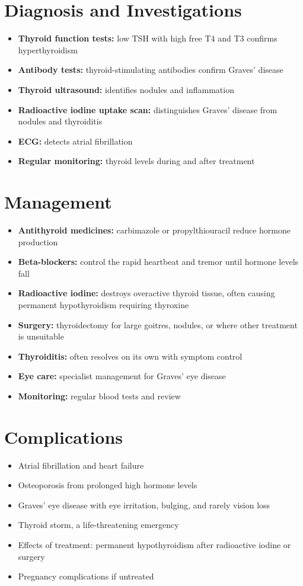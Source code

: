 \section*{Diagnosis and Investigations}
\begin{itemize}
    \item \textbf{Thyroid function tests:} low TSH with high free T4 and T3 confirms hyperthyroidism
    \item \textbf{Antibody tests:} thyroid-stimulating antibodies confirm Graves' disease
    \item \textbf{Thyroid ultrasound:} identifies nodules and inflammation
    \item \textbf{Radioactive iodine uptake scan:} distinguishes Graves' disease from nodules and thyroiditis
    \item \textbf{ECG:} detects atrial fibrillation
    \item \textbf{Regular monitoring:} thyroid levels during and after treatment
\end{itemize}

\section*{Management}
\begin{itemize}
    \item \textbf{Antithyroid medicines:} carbimazole or propylthiouracil reduce hormone production
    \item \textbf{Beta-blockers:} control the rapid heartbeat and tremor until hormone levels fall
    \item \textbf{Radioactive iodine:} destroys overactive thyroid tissue, often causing permanent hypothyroidism requiring thyroxine
    \item \textbf{Surgery:} thyroidectomy for large goitres, nodules, or where other treatment is unsuitable
    \item \textbf{Thyroiditis:} often resolves on its own with symptom control
    \item \textbf{Eye care:} specialist management for Graves' eye disease
    \item \textbf{Monitoring:} regular blood tests and review
\end{itemize}

\section*{Complications}
\begin{itemize}
    \item Atrial fibrillation and heart failure
    \item Osteoporosis from prolonged high hormone levels
    \item Graves' eye disease with eye irritation, bulging, and rarely vision loss
    \item Thyroid storm, a life-threatening emergency
    \item Effects of treatment: permanent hypothyroidism after radioactive iodine or surgery
    \item Pregnancy complications if untreated
\end{itemize}

